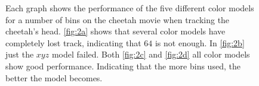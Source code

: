 \documentclass[11pt]{article}
\begin{document}
\begin{figure}[!ht]
{\label{fig:2c}
}
\caption{Each graph shows the performance of the five different color models for
a number of bins on the cheetah movie when tracking the cheetah's head.
\ref{fig:2a} shows that several color models have completely lost track,
indicating that $64$ is not enough. In \ref{fig:2b} just the $xyz$ model failed.
Both \ref{fig:2c} and \ref{fig:2d} all color models show good performance.
Indicating that the more bins used, the better the model becomes.}
\label{fig:cheetah}
\end{figure}
\end{document}
